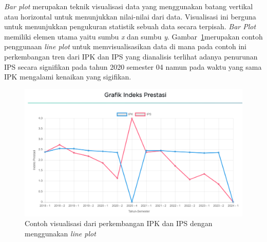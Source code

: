 \textit{Bar plot} merupakan teknik visualisasi data yang menggunakan batang vertikal atau horizontal untuk menunjukkan nilai-nilai dari data. Visualisasi ini berguna untuk menunjukkan pengukuran statistik sebuah data secara terpisah. \textit{Bar Plot} memiliki elemen utama yaitu sumbu \textit{x} dan sumbu \textit{y}. Gambar~\ref{fig:contoh lineplot}merupakan contoh penggunaan \textit{line plot} untuk memvisualisasikan data di mana pada contoh ini perkembangan tren dari IPK dan IPS yang dianalisis terlihat adanya penurunan IPS secara signifikan pada tahun 2020 semester 04 namun pada waktu yang sama IPK mengalami kenaikan yang sigifikan. 
\begin{figure}[H]
    \centering
    \includegraphics[width=0.5\linewidth]{Gambar/ContohLineChart.png}
    \caption{Contoh visualisasi dari perkembangan IPK dan IPS dengan menggunakan \textit{line plot}}
    \label{fig:contoh lineplot}
\end{figure}
